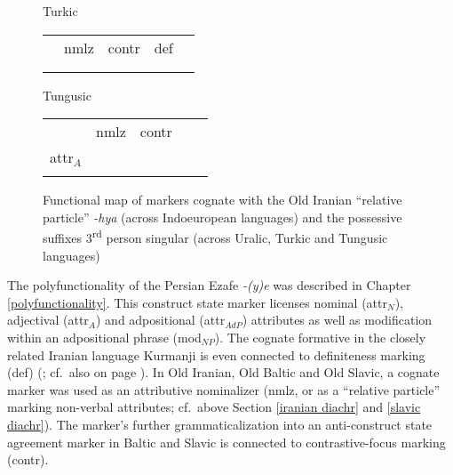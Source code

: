 {\begin{figure}[htbp]
\parbox[b]{0.5\textwidth}{
\begin{center}{\sc Turkic}\\
\medskip
\begin{tabular}{| c || c | c | c | c}
\cline{1-1}
\\
\cline{1-1}
\\
\hline
 & {\sc nmlz} & {\sc contr} & {\sc def}\\
\hline
\\
\cline{1-1}
\\
\cline{1-1}
\end{tabular}
\end{center}
}
\parbox[b]{0.5\textwidth}{
\begin{center}{\sc Tungusic}\\
\medskip
\begin{tabular}{| c || c | c | c | c}
\cline{1-1}
\\
\cline{1-1}
\\
\hline
 & {\sc nmlz} & {\sc contr} & \\
\hline
{\sc attr}$_{A}$\\
\cline{1-1}
\\
\cline{1-1}
\end{tabular}
\end{center}
}
\caption[Functional map of cognate devices]{Functional map of markers cognate with the Old Iranian “relative particle” \textit{-hya} (across Indoeuropean languages) and the possessive suffixes 3\textsuperscript{rd} person singular (across Uralic, Turkic and Tungusic languages)}
\label{ie-ural funcmap}
\end{figure}
The polyfunctionality of the Persian Ezafe \textit{-(y)e} was described in Chapter \ref{polyfunctionality}. This construct state marker licenses nominal ({\sc attr}$_{N}$), adjectival ({\sc attr}$_{A}$) and adpositional ({\sc attr}$_{AdP}$) attributes as well as modification within an adpositional phrase ({\sc mod}$_{NP}$). The cognate formative in the closely related Iranian language Kurmanji is even connected to definiteness marking ({\sc def}) (\citealt{schroder2002}; cf.~also  on page \pageref{ez kirmanji paradigm}). In Old Iranian, Old Baltic and Old Slavic, a cognate marker was used as an attributive nominalizer ({\sc nmlz}, or as a “relative particle” marking non-verbal attributes; cf.~above Section \ref{iranian diachr} and \ref{slavic diachr}). The marker's further grammaticalization into an anti-construct state agreement marker in Baltic and Slavic is connected to contrastive-focus marking ({\sc contr}).

}
